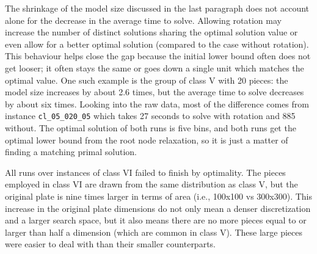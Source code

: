 The shrinkage of the model size discussed in the last paragraph does not account alone for the decrease in the average time to solve.
Allowing rotation may increase the number of distinct solutions sharing the optimal solution value or even allow for a better optimal solution (compared to the case without rotation).
This behaviour helps close the gap because the initial lower bound often does not get looser; it often stays the same or goes down a single unit which matches the optimal value.
One such example is the group of class V with 20 pieces: the model size increases by about 2.6 times, but the average time to solve decreases by about six times.
Looking into the raw data, most of the difference comes from instance \texttt{cl\_05\_020\_05} which takes 27 seconds to solve with rotation and 885 without.
The optimal solution of both runs is five bins, and both runs get the optimal lower bound from the root node relaxation, so it is just a matter of finding a matching primal solution.

All runs over instances of class VI failed to finish by optimality.
The pieces employed in class VI are drawn from the same distribution as class V, but the original plate is nine times larger in terms of area (i.e., 100x100 vs 300x300).
This increase in the original plate dimensions do not only mean a denser discretization and a larger search space, but it also means there are no more pieces equal to or larger than half a dimension (which are common in class V).
These large pieces were easier to deal with than their smaller counterparts.

